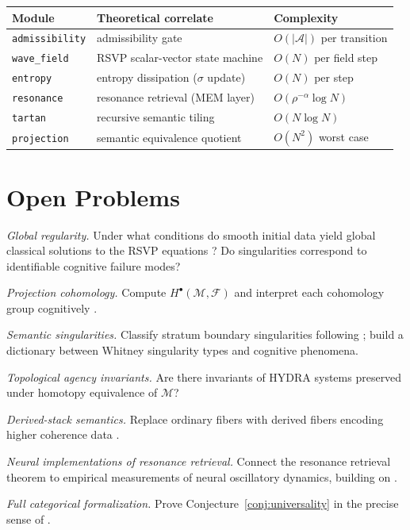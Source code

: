 \documentclass[12pt, a4paper]{article}
\theoremstyle{rsvpstyle}
\theoremstyle{definition}
\newcommand{\OpMan}{\mathcal{M}}
\newcommand{\Adm}{\mathcal{A}}
\begin{document}
\begin{center}
\begin{tabular}{lll}
\toprule
\textbf{Module} & \textbf{Theoretical correlate} & \textbf{Complexity} \\
\midrule
\texttt{admissibility} & admissibility gate & $O(|\Adm|)$ per transition \\
\texttt{wave\_field} & RSVP scalar-vector state machine & $O(N)$ per field step \\
\texttt{entropy} & entropy dissipation ($\sigma$ update) & $O(N)$ per step \\
\texttt{resonance} & resonance retrieval (MEM\textbar8 layer) & $O(\rho^{-\alpha}\log N)$ \\
\texttt{tartan} & recursive semantic tiling & $O(N\log N)$ \\
\texttt{projection} & semantic equivalence quotient & $O(N^2)$ worst case \\
\bottomrule
\end{tabular}
\end{center}

\section{Open Problems}

\emph{Global regularity.} Under what conditions do smooth initial data yield
global classical solutions to the RSVP equations \citep{Tao2016}? Do
singularities correspond to identifiable cognitive failure modes?

\emph{Projection cohomology.} Compute $H^\bullet(\OpMan, \mathcal{F})$ and
interpret each cohomology group cognitively \citep{EdelsbrunnerHarer2010}.

\emph{Semantic singularities.} Classify stratum boundary singularities following
\citet{Mather1973}; build a dictionary between Whitney singularity types and
cognitive phenomena.

\emph{Topological agency invariants.} Are there invariants of HYDRA systems
preserved under homotopy equivalence of $\OpMan$? \citep{Ghrist2014}

\emph{Derived-stack semantics.} Replace ordinary fibers with derived fibers
encoding higher coherence data \citep{Lurie2009}.

\emph{Neural implementations of resonance retrieval.} Connect the resonance
retrieval theorem to empirical measurements of neural oscillatory dynamics,
building on \citet{WilsonCowan1972}.

\emph{Full categorical formalization.} Prove Conjecture~\ref{conj:universality}
in the precise sense of \citet{EilenbergMacLane1945,MacLane1998}.
\end{document}
